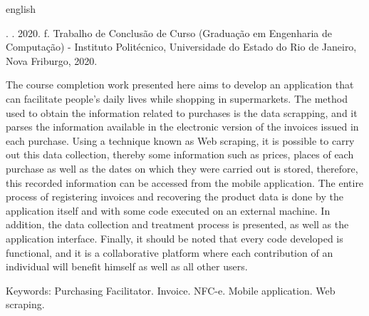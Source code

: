 
\begin{resumo}[Abstract]
\begin{otherlanguage*}{english}

\noindent
\entradaAutor{}. \textit{\englishTitle{}}. 2020. \pageref{LastPage} f. Trabalho de Conclusão de Curso (Graduação em Engenharia de Computação) - Instituto Politécnico, Universidade do Estado do Rio de Janeiro, Nova Friburgo, 2020.
\vspace{\onelineskip}

\setlength{\parindent}{1.3cm}
The course completion work presented here aims to develop an application that can facilitate people's daily lives while shopping in supermarkets. The method used to obtain the information related to purchases is the data scrapping, and it parses the information available in the electronic version of the invoices issued in each purchase. Using a technique known as Web scraping, it is possible to carry out this data collection, thereby some information such as prices, places of each purchase as well as the dates on which they were carried out is stored, therefore, this recorded information can be accessed from the mobile application. The entire process of registering invoices and recovering the product data is done by the application itself and with some code executed on an external machine. In addition, the data collection and treatment process is presented, as well as the application interface. Finally, it should be noted that every code developed is functional, and it is a collaborative platform where each contribution of an individual will benefit himself as well as all other users.

\vspace{\onelineskip}
\noindent Keywords: Purchasing Facilitator. Invoice. NFC-e. Mobile application. Web scraping.

\end{otherlanguage*}
\end{resumo}